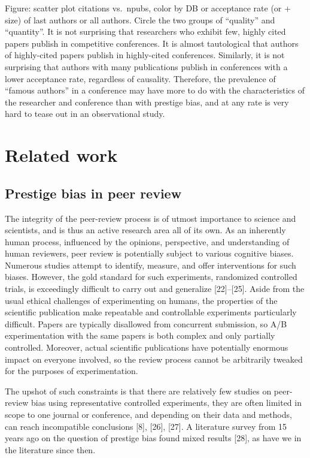 \documentclass[12pt]{article}
\begin{document}
Figure: scatter plot citations vs.~npubs, color by DB or acceptance rate (or + size) of last authors or all authors. Circle the two groups of ``quality'' and ``quantity''.
It is not surprising that researchers who exhibit few, highly cited papers publish in competitive conferences. It is almost tautological that authors of highly-cited papers publish in highly-cited conferences.
Similarly, it is not surprising that authors with many publications publish in conferences with a lower acceptance rate, regardless of causality.
Therefore, the prevalence of ``famous authors'' in a conference may have more to do with the characteristics of the researcher and conference than with prestige bias, and at any rate is very hard to tease out in an observational study.

\hypertarget{sec:related}{%
\section{Related work}\label{sec:related}}

\hypertarget{prestige-bias-in-peer-review}{%
\subsection{Prestige bias in peer review}\label{prestige-bias-in-peer-review}}

The integrity of the peer-review process is of utmost importance to science and scientists, and is thus an active research area all of its own.
As an inherently human process, influenced by the opinions, perspective, and understanding of human reviewers, peer review is potentially subject to various cognitive biases.
Numerous studies attempt to identify, measure, and offer interventions for such biases.
However, the gold standard for such experiments, randomized controlled trials, is exceedingly difficult to carry out and generalize {[}22{]}--{[}25{]}.
Aside from the usual ethical challenges of experimenting on humans, the properties of the scientific publication make repeatable and controllable experiments particularly difficult.
Papers are typically disallowed from concurrent submission, so A/B experimentation with the same papers is both complex and only partially controlled.
Moreover, actual scientific publications have potentially enormous impact on everyone involved, so the review process cannot be arbitrarily tweaked for the purposes of experimentation.

The upshot of such constraints is that there are relatively few studies on peer-review bias using representative controlled experiments, they are often limited in scope to one journal or conference, and depending on their data and methods, can reach incompatible conclusions {[}8{]}, {[}26{]}, {[}27{]}.
A literature survey from 15 years ago on the question of prestige bias found mixed results {[}28{]}, as have we in the literature since then.
\end{document}

